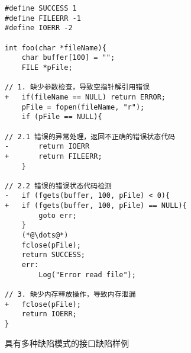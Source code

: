 \begin{figure}[t]
	\centering
	\begin{minipage}[t]{0.8\linewidth}
\begin{lstlisting}
#define SUCCESS 1
#define FILEERR -1
#define IOERR -2		

int foo(char *fileName){
	char buffer[100] = "";
	FILE *pFile;

// 1. 缺少参数检查，导致空指针解引用错误
+   if(fileName == NULL) return ERROR;
	pFile = fopen(fileName, "r");
	if (pFile == NULL){

// 2.1 错误的异常处理，返回不正确的错误状态代码
-       return IOERR
+       return FILEERR;
	}

// 2.2 错误的错误状态代码检测
-   if (fgets(buffer, 100, pFile) < 0){
+   if (fgets(buffer, 100, pFile) == NULL){
		goto err;
	}
	(*@\dots@*)
	fclose(pFile);
	return SUCCESS; 
	err:
		Log("Error read file");

// 3. 缺少内存释放操作，导致内存泄漏
+   fclose(pFile);
	return IOERR;
}
\end{lstlisting}
	\caption{
	具有多种缺陷模式的接口缺陷样例
	}
	\label{fig:2-4-example}
	\end{minipage}
\end{figure}